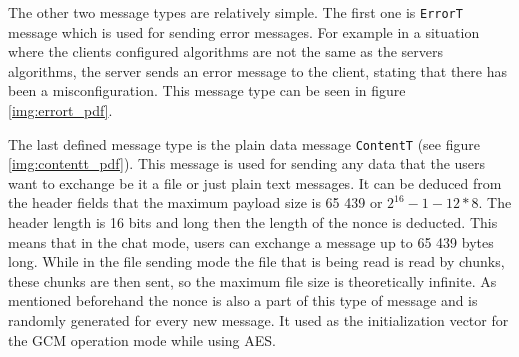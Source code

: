 The other two message types are relatively simple. The first one is \texttt{ErrorT} message which is used for sending error messages. For example in a situation where the clients configured algorithms are not the same as the servers algorithms, the server sends an error message to the client, stating that there has been a misconfiguration. This message type can be seen in figure \ref{img:errort_pdf}.

The last defined message type is the plain data message \texttt{ContentT} (see figure \ref{img:contentt_pdf}). This message is used for sending any data that the users want to exchange be it a file or just plain text messages. It can be deduced from the header fields that the maximum payload size is 65 439 or $2^{16}-1-12*8$. The header length is 16 bits and long then the length of the nonce is deducted. This means that in the chat mode, users can exchange a message up to 65 439 bytes long. While in the file sending mode the file that is being read is read by chunks, these chunks are then sent, so the maximum file size is theoretically infinite. As mentioned beforehand the nonce is also a part of this type of message and is randomly generated for every new message. It used as the initialization vector for the GCM operation mode while using AES.

